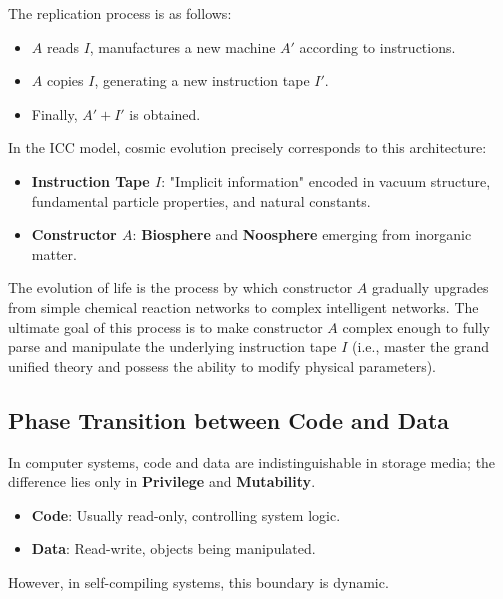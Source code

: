 The replication process is as follows:

\begin{itemize}
\item $A$ reads $I$, manufactures a new machine $A'$ according to instructions.

\item $A$ copies $I$, generating a new instruction tape $I'$.

\item Finally, $A' + I'$ is obtained.
\end{itemize}

In the ICC model, cosmic evolution precisely corresponds to this architecture:

\begin{itemize}
\item \textbf{Instruction Tape $I$}: "Implicit information" encoded in vacuum structure, fundamental particle properties, and natural constants.

\item \textbf{Constructor $A$}: \textbf{Biosphere} and \textbf{Noosphere} emerging from inorganic matter.
\end{itemize}

The evolution of life is the process by which constructor $A$ gradually upgrades from simple chemical reaction networks to complex intelligent networks. The ultimate goal of this process is to make constructor $A$ complex enough to fully parse and manipulate the underlying instruction tape $I$ (i.e., master the grand unified theory and possess the ability to modify physical parameters).

\subsection{Phase Transition between Code and Data}

In computer systems, code and data are indistinguishable in storage media; the difference lies only in \textbf{Privilege} and \textbf{Mutability}.

\begin{itemize}
\item \textbf{Code}: Usually read-only, controlling system logic.

\item \textbf{Data}: Read-write, objects being manipulated.
\end{itemize}

However, in self-compiling systems, this boundary is dynamic.

